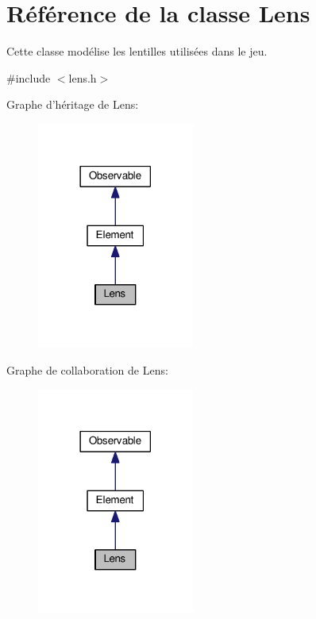 \hypertarget{classLens}{\section{Référence de la classe Lens}
\label{classLens}
}


Cette classe modélise les lentilles utilisées dans le jeu.  




{\ttfamily \#include $<$lens.\+h$>$}



Graphe d'héritage de Lens\+:\nopagebreak
\begin{figure}[H]
\begin{center}
\leavevmode
\includegraphics[width=146pt]{d4/def/classLens__inherit__graph}
\end{center}
\end{figure}


Graphe de collaboration de Lens\+:\nopagebreak
\begin{figure}[H]
\begin{center}
\leavevmode
\includegraphics[width=146pt]{d8/df0/classLens__coll__graph}
\end{center}
\end{figure}
